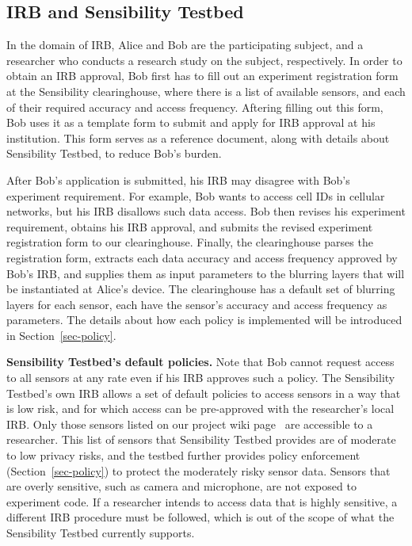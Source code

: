 \subsection{IRB and Sensibility Testbed}\label{sec-irb-policies}

In the domain of IRB, Alice and Bob are the participating subject, and 
a researcher who conducts a research study on the subject, respectively.
In order to obtain an IRB approval, Bob first has to fill out an experiment
registration form  at the 
Sensibility clearinghouse, where
there is a list of available sensors, and each of their required accuracy 
and access frequency. Aftering filling out this form, Bob uses it as 
a template form to submit and apply for IRB approval at his institution. 
This form serves as a reference document, along with details about 
Sensibility Testbed, to reduce Bob's burden. 

After Bob's application is submitted, his IRB may disagree with 
Bob's experiment requirement. For example, Bob wants to access cell 
IDs in cellular networks, but his IRB disallows such data access. Bob then
revises his experiment requirement, obtains his IRB approval, and
submits the revised experiment registration form to our clearinghouse. Finally, the clearinghouse
parses the registration form, extracts each data accuracy and access 
frequency approved by Bob's IRB, and supplies them as input parameters to
the blurring layers that will be instantiated at Alice's device. The clearinghouse
has a default set of blurring layers for each sensor, each have the 
sensor's accuracy and access frequency as parameters. The details about
how each policy is implemented will be introduced in 
Section~\ref{sec-policy}.

\textbf{Sensibility Testbed's default policies.}
Note that Bob cannot request access to all sensors at any rate
even if his IRB approves such a policy. The Sensibility Testbed's
own IRB allows a set of default policies to access sensors in a
way that is low risk, and for which access can be pre-approved with the
researcher's local IRB. Only those sensors listed on our project 
wiki page~\cite{sensor-api} are accessible to a researcher. 
This list of sensors that Sensibility Testbed provides are of moderate 
to low privacy risks, and the testbed further provides policy enforcement
(Section~\ref{sec-policy}) to protect the moderately risky sensor data. Sensors 
that are overly sensitive, such as camera and microphone, are not 
exposed to experiment code. If a researcher intends to access 
data that is highly sensitive, a different IRB procedure must be followed, 
which is out of the scope of what the Sensibility Testbed currently 
supports.

